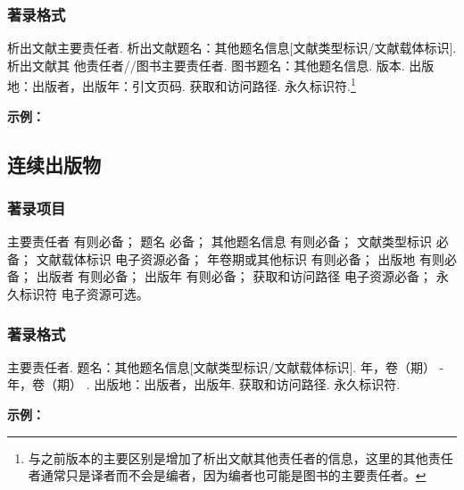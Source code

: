 \documentclass{article}
\begin{document}
\subsubsection{著录格式}

析出文献主要责任者. 析出文献题名：其他题名信息[文献类型标识/文献载体标识]. 析出文献其
他责任者//图书主要责任者. 图书题名：其他题名信息. 版本. 出版地：出版者，出版年：引文页码.
获取和访问路径. 永久标识符.\footnote{与之前版本的主要区别是增加了析出文献其他责任者的信息，这里的其他责任者通常只是译者而不会是编者，因为编者也可能是图书的主要责任者。}

\begin{refsection}

\nocite{
1988-590-590,
阿扬2023,
王夫之2011-1109-1109,
程根伟1999-32-36,
陈晋镳1980-56-114a,
马克思2013-302-302,
楼梦麟2011-11-12,
Weinstein1974-745-772,
Roberson2011-1-36
}


\textbf{示例：}

{\printbibliography[heading=none,env=indentegenv]}
\end{refsection}

\subsection{连续出版物}

\subsubsection{著录项目}

主要责任者 有则必备；
题名 必备；
其他题名信息 有则必备；
文献类型标识 必备；
文献载体标识 电子资源必备；
年卷期或其他标识 有则必备；
出版地 有则必备；
出版者 有则必备；
出版年 有则必备；
获取和访问路径 电子资源必备；
永久标识符 电子资源可选。

\subsubsection{著录格式}

主要责任者. 题名：其他题名信息[文献类型标识/文献载体标识]. 年，卷（期） -年，卷（期） .
出版地：出版者，出版年. 获取和访问路径. 永久标识符.



\begin{refsection}

\nocite{
中华医学会湖北分会1984----,
中国图书馆学会1957--1990--,
AAAS1883----,
Publiclibrary1979}


\textbf{示例：}

{\printbibliography[heading=none,env=indentegenv]}
\end{refsection}
\end{document}
